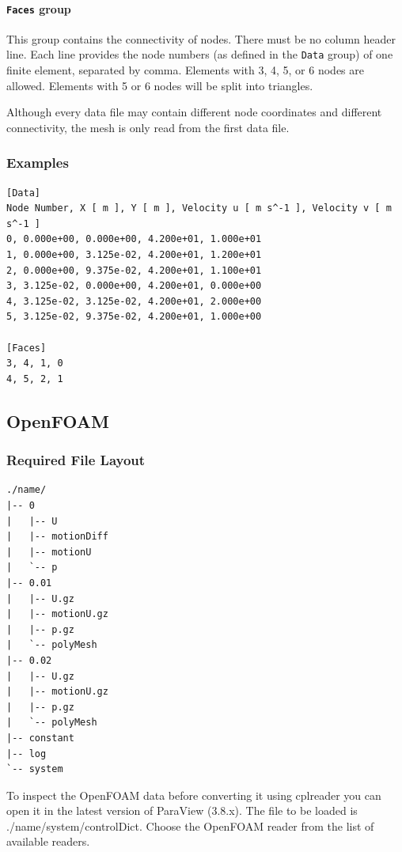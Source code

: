\documentclass[a4paper,10pt]{article}
\begin{document}
\paragraph{\texttt{Faces} group}
This group contains the connectivity of  nodes. There must be no column header
line. Each  line provides  the node numbers  (as defined in  the \texttt{Data}
group) of one finite element, separated by  comma. Elements with 3, 4, 5, or 6
nodes are allowed. Elements with 5 or 6 nodes will be split into triangles.

Although every data file may  contain different node coordinates and different
connectivity, the mesh is only read from the first data file.

\subsubsection{Examples}
\begin{verbatim}
[Data]
Node Number, X [ m ], Y [ m ], Velocity u [ m s^-1 ], Velocity v [ m s^-1 ]
0, 0.000e+00, 0.000e+00, 4.200e+01, 1.000e+01 
1, 0.000e+00, 3.125e-02, 4.200e+01, 1.200e+01
2, 0.000e+00, 9.375e-02, 4.200e+01, 1.100e+01
3, 3.125e-02, 0.000e+00, 4.200e+01, 0.000e+00
4, 3.125e-02, 3.125e-02, 4.200e+01, 2.000e+00
5, 3.125e-02, 9.375e-02, 4.200e+01, 1.000e+00

[Faces]
3, 4, 1, 0
4, 5, 2, 1
\end{verbatim}

\newpage
\subsection{OpenFOAM}
\label{sec:openfoam}

\subsubsection{Required File Layout}
\begin{verbatim}
./name/
|-- 0
|   |-- U
|   |-- motionDiff
|   |-- motionU
|   `-- p
|-- 0.01
|   |-- U.gz
|   |-- motionU.gz
|   |-- p.gz
|   `-- polyMesh
|-- 0.02
|   |-- U.gz
|   |-- motionU.gz
|   |-- p.gz
|   `-- polyMesh
|-- constant
|-- log
`-- system
\end{verbatim}

To inspect the OpenFOAM data before converting it using cplreader you can open
it  in the  latest  version of  ParaView (3.8.x).  The  file to  be loaded  is
./name/system/controlDict.  Choose  the  OpenFOAM  reader  from  the  list  of
available readers.
\end{document}
